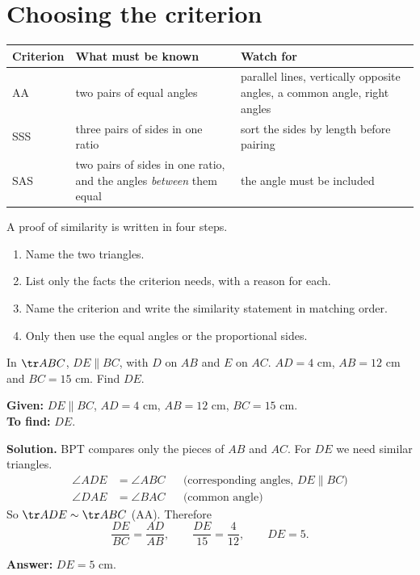 \section{Choosing the criterion}

\begin{center}
\begin{tabular}{@{}p{2.0cm}>{\raggedright\arraybackslash}p{6.0cm}>{\raggedright\arraybackslash}p{6.2cm}@{}}
\textbf{Criterion} & \textbf{What must be known} & \textbf{Watch for}\\[2pt]
\hline
AA  & two pairs of equal angles & parallel lines, vertically opposite angles, a common angle, right angles\\
SSS & three pairs of sides in one ratio & sort the sides by length before pairing\\
SAS & two pairs of sides in one ratio, and the angles \emph{between} them equal & the angle must be included
\end{tabular}
\end{center}

A proof of similarity is written in four steps.
\begin{enumerate}[leftmargin=1.8em,itemsep=2pt]
  \item Name the two triangles.
  \item List only the facts the criterion needs, with a reason for each.
  \item Name the criterion and write the similarity statement in matching order.
  \item Only then use the equal angles or the proportional sides.
\end{enumerate}

\begin{example}
In $\tr ABC$, $DE\parallel BC$, with $D$ on $AB$ and $E$ on $AC$. $AD=4$ cm, $AB=12$ cm and $BC=15$ cm. Find $DE$.


\textbf{Given:} $DE\parallel BC$, $AD=4$ cm, $AB=12$ cm, $BC=15$ cm.\\
\textbf{To find:} $DE$.

\textbf{Solution.} BPT compares only the pieces of $AB$ and $AC$. For $DE$ we need similar triangles.
\[
\begin{aligned}
\angle ADE&=\angle ABC &&\text{(corresponding angles, $DE\parallel BC$)}\\
\angle DAE&=\angle BAC &&\text{(common angle)}
\end{aligned}
\]
So $\tr ADE\sim\tr ABC$ (AA). Therefore
\[
\dfrac{DE}{BC}=\dfrac{AD}{AB},\qquad \dfrac{DE}{15}=\dfrac4{12},\qquad DE=5.
\]

\textbf{Answer:} $DE=5$ cm.
\end{example}

